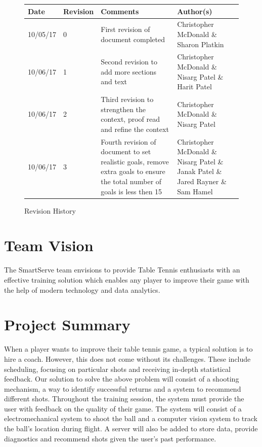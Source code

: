 \documentclass[11pt]{article}
\begin{document}
\tableofcontents
\listoffigures

\vfill
\begin{figure}[htbp]
   \centering
   \noindent\begin{tabularx}{\textwidth}{|X|p{2cm}|X|X|}
   \hline 
   \textbf{Date} & \textbf{Revision} & \textbf{Comments} & \textbf{Author(s)} \\
   \hline 
   10/05/17 & 0 & First revision of document completed & Christopher McDonald \& Sharon Platkin \\ \hline
   10/06/17 & 1 & Second revision to add more sections and text & Christopher McDonald \& Nisarg Patel \& Harit Patel \\ \hline
   10/06/17 & 2 & Third revision to strengthen the context, proof read and refine the context & Christopher McDonald \& Nisarg Patel \\ \hline
   10/06/17 & 3 & Fourth revision of document to set realistic goals, remove extra goals to ensure the total number of goals is less then 15 & Christopher McDonald \& Nisarg Patel \& Janak Patel \& Jared Rayner \& Sam Hamel \\
   \hline
   \end{tabularx}
   \caption{Revision History}
\end{figure}

\newpage
\section{Team Vision}
The SmartServe team envisions to provide Table Tennis enthusiasts with an effective training solution which enables any player to improve their game with the help of modern technology and data analytics.
\section{Project Summary}
When a player wants to improve their table tennis game, a typical solution is to hire a coach. However, this does not come without its challenges. These include scheduling, focusing on particular shots and receiving in-depth statistical feedback.
Our solution to solve the above problem will consist of a shooting mechanism, a way to identify successful returns and a system to recommend different shots. Throughout the training session, the system must provide the user with feedback on the quality of their game.
The system will consist of a electromechanical system to shoot the ball and a computer vision system to track the ball's location during flight. A server will also be added to store data, provide diagnostics and recommend shots given the user's past performance.
\end{document}
